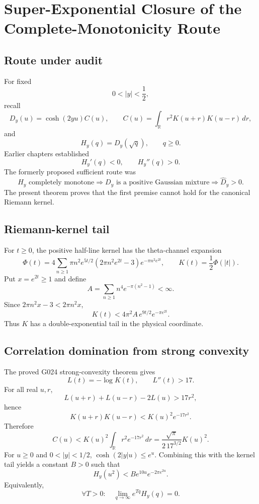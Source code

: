 \chapter{Super-Exponential Closure of the Complete-Monotonicity Route}
\label{chap:g024-complete-monotonicity-nogo}


\section{Route under audit}
For fixed
\[
0<|y|<\frac12,
\]
recall
\[
D_y(u)=\cosh(2yu)C(u),\qquad
C(u)=\int_{\mathbb R}r^2K(u+r)K(u-r)\,dr,
\]
and
\[
H_y(q)=D_y(\sqrt q),\qquad q\ge0.
\]
Earlier chapters established
\[
H_y'(q)<0,\qquad H_y''(q)>0.
\]
The formerly proposed sufficient route was
\[
H_y\text{ completely monotone}
\Longrightarrow
D_y\text{ is a positive Gaussian mixture}
\Longrightarrow
\widehat D_y>0.
\]
The present theorem proves that the first premise cannot hold for the canonical Riemann kernel.

\section{Riemann-kernel tail}
For $t\ge0$, the positive half-line kernel has the theta-channel expansion
\[
\Phi(t)=4\sum_{n\ge1}\pi n^2e^{5t/2}
\left(2\pi n^2e^{2t}-3\right)e^{-\pi n^2e^{2t}},
\qquad K(t)=\frac12\Phi(|t|).
\]
Put $x=e^{2t}\ge1$ and define
\[
A=\sum_{n\ge1}n^4e^{-\pi(n^2-1)}<\infty.
\]
Since $2\pi n^2x-3<2\pi n^2x$,
\[
\boxed{K(t)<4\pi^2A\,e^{9t/2}e^{-\pi e^{2t}}.}
\]
Thus $K$ has a double-exponential tail in the physical coordinate.

\section{Correlation domination from strong convexity}
The proved G024 strong-convexity theorem gives
\[
L(t)=-\log K(t),\qquad L''(t)>17.
\]
For all real $u,r$,
\[
L(u+r)+L(u-r)-2L(u)>17r^2,
\]
hence
\[
\boxed{K(u+r)K(u-r)<K(u)^2e^{-17r^2}.}
\]
Therefore
\[
C(u)<K(u)^2\int_{\mathbb R}r^2e^{-17r^2}\,dr
=\frac{\sqrt\pi}{2\,17^{3/2}}K(u)^2.
\]
For $u\ge0$ and $0<|y|<1/2$, $\cosh(2|y|u)\le e^u$. Combining this with the kernel tail yields a constant $B>0$ such that
\[
\boxed{H_y(u^2)<B e^{10u}e^{-2\pi e^{2u}}.}
\]
Equivalently,
\[
\boxed{\forall T>0:\quad \lim_{q\to\infty}e^{Tq}H_y(q)=0.}
\]


